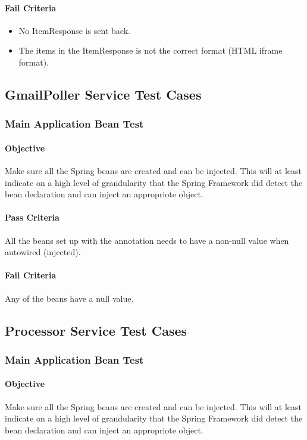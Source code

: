 \documentclass[hidelinks,english]{article}
\begin{document}
			\paragraph{Fail Criteria}
			\begin{itemize}
				\item No ItemResponse is sent back.
				\item The items in the ItemResponse is not the correct format (HTML iframe format).
			\end{itemize}
			
	\subsection{GmailPoller Service Test Cases}
		\subsubsection{Main Application Bean Test}\label{gmailapplicationbeanstest}
			\paragraph{Objective} Make sure all the Spring beans are created and can be injected. This will at least indicate on a high level of grandularity that the Spring Framework did detect the bean declaration and can inject an appropriote object.
			\paragraph{Pass Criteria} All the beans set up with the \emph{\@Bean} annotation needs to have a non-null value when autowired (injected).
			\paragraph{Fail Criteria} Any of the beans have a null value.
			
	\subsection{Processor Service Test Cases}
		\subsubsection{Main Application Bean Test}\label{processorapplicationbeanstest}
			\paragraph{Objective} Make sure all the Spring beans are created and can be injected. This will at least indicate on a high level of grandularity that the Spring Framework did detect the bean declaration and can inject an appropriote object.
\end{document}
